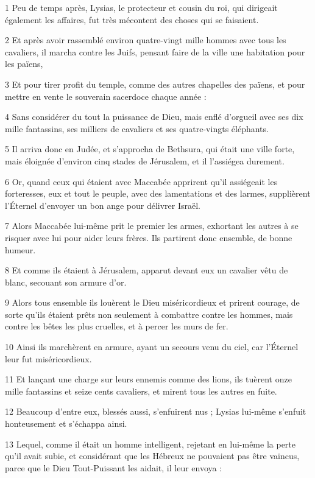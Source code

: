 
\par 1 Peu de temps après, Lysias, le protecteur et cousin du roi, qui dirigeait également les affaires, fut très mécontent des choses qui se faisaient.
\par 2 Et après avoir rassemblé environ quatre-vingt mille hommes avec tous les cavaliers, il marcha contre les Juifs, pensant faire de la ville une habitation pour les païens,
\par 3 Et pour tirer profit du temple, comme des autres chapelles des païens, et pour mettre en vente le souverain sacerdoce chaque année :
\par 4 Sans considérer du tout la puissance de Dieu, mais enflé d'orgueil avec ses dix mille fantassins, ses milliers de cavaliers et ses quatre-vingts éléphants.
\par 5 Il arriva donc en Judée, et s'approcha de Bethsura, qui était une ville forte, mais éloignée d'environ cinq stades de Jérusalem, et il l'assiégea durement.
\par 6 Or, quand ceux qui étaient avec Maccabée apprirent qu'il assiégeait les forteresses, eux et tout le peuple, avec des lamentations et des larmes, supplièrent l'Éternel d'envoyer un bon ange pour délivrer Israël.
\par 7 Alors Maccabée lui-même prit le premier les armes, exhortant les autres à se risquer avec lui pour aider leurs frères. Ils partirent donc ensemble, de bonne humeur.
\par 8 Et comme ils étaient à Jérusalem, apparut devant eux un cavalier vêtu de blanc, secouant son armure d'or.
\par 9 Alors tous ensemble ils louèrent le Dieu miséricordieux et prirent courage, de sorte qu'ils étaient prêts non seulement à combattre contre les hommes, mais contre les bêtes les plus cruelles, et à percer les murs de fer.
\par 10 Ainsi ils marchèrent en armure, ayant un secours venu du ciel, car l'Éternel leur fut miséricordieux.
\par 11 Et lançant une charge sur leurs ennemis comme des lions, ils tuèrent onze mille fantassins et seize cents cavaliers, et mirent tous les autres en fuite.
\par 12 Beaucoup d'entre eux, blessés aussi, s'enfuirent nus ; Lysias lui-même s'enfuit honteusement et s'échappa ainsi.
\par 13 Lequel, comme il était un homme intelligent, rejetant en lui-même la perte qu'il avait subie, et considérant que les Hébreux ne pouvaient pas être vaincus, parce que le Dieu Tout-Puissant les aidait, il leur envoya :
